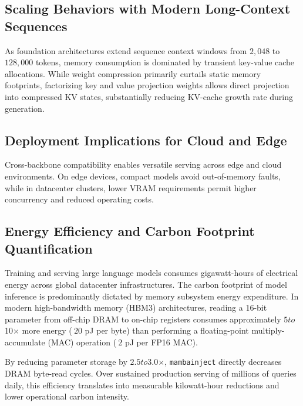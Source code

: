 \subsection{Scaling Behaviors with Modern Long-Context Sequences}
As foundation architectures extend sequence context windows from $2{,}048$ to $128{,}000$ tokens, memory consumption is dominated by transient key-value cache allocations. While weight compression primarily curtails static memory footprints, factorizing key and value projection weights allows direct projection into compressed KV states, substantially reducing KV-cache growth rate during generation.

\subsection{Deployment Implications for Cloud and Edge}
Cross-backbone compatibility enables versatile serving across edge and cloud environments. On edge devices, compact models avoid out-of-memory faults, while in datacenter clusters, lower VRAM requirements permit higher concurrency and reduced operating costs.

\subsection{Energy Efficiency and Carbon Footprint Quantification}
Training and serving large language models consumes gigawatt-hours of electrical energy across global datacenter infrastructures. The carbon footprint of model inference is predominantly dictated by memory subsystem energy expenditure. In modern high-bandwidth memory (HBM3) architectures, reading a 16-bit parameter from off-chip DRAM to on-chip registers consumes approximately $5$\times$ to $10$\times$ more energy ($~20$ pJ per byte) than performing a floating-point multiply-accumulate (MAC) operation ($~2$ pJ per FP16 MAC).

By reducing parameter storage by $2.5$\times$ to $3.0$\times$, \texttt{mambainject} directly decreases DRAM byte-read cycles. Over sustained production serving of millions of queries daily, this efficiency translates into measurable kilowatt-hour reductions and lower operational carbon intensity.
